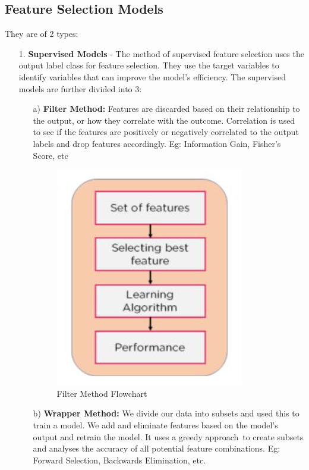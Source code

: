 \documentclass[11pt, twosides]{article}
\begin{document}

\subsection{Feature Selection Models}
They are of 2 types:
\begin{itemize}
    \item[1.] \textbf{Supervised Models} - The method of supervised feature selection uses the output label class for feature selection. They use the target variables to identify variables that can improve the model's efficiency. The supervised models are further divided into 3:
    \begin{itemize}
        \item[a)] \textbf{Filter Method:} Features are discarded based on their relationship to the output, or how they correlate with the outcome.  Correlation is used to see if the features are positively or negatively correlated to the output labels and drop features accordingly. Eg: Information Gain, Fisher’s Score, etc
        \begin{figure}[H]
        \centering
        \includegraphics[scale =0.9]{Filter Method Flowchart.png}
        \caption{Filter Method Flowchart}
        \end{figure}
        \item[b)] \textbf{Wrapper Method:} We divide our data into subsets and used this to train a model. We add and eliminate features based on the model's output and retrain the model. It uses a greedy approach to create subsets and analyses the accuracy of all potential feature combinations. Eg: Forward Selection, Backwards Elimination, etc.

\end{itemize}
\end{itemize}
\end{document}
